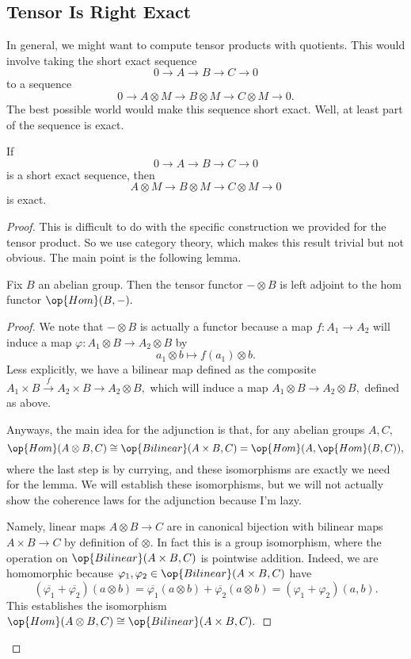 \documentclass[../notes.tex]{subfiles}
\begin{document}
\subsection{Tensor Is Right Exact}
In general, we might want to compute tensor products with quotients. This would involve taking the short exact sequence
\[0\to A\to B\to C\to 0\]
to a sequence
\[0\to A\otimes M\to B\otimes M\to C\otimes M\to0.\]
The best possible world would make this sequence short exact. Well, at least part of the sequence is exact.
\begin{theorem} \label{prop:tensorrightexact}
	If
	\[0\to A\to B\to C\to0\]
	is a short exact sequence, then
	\[A\otimes M\to B\otimes M\to C\otimes M\to0\]
	is exact.
\end{theorem}
\begin{proof}
	This is difficult to do with the specific construction we provided for the tensor product. So we use category theory, which makes this result trivial but not obvious. The main point is the following lemma.
	\begin{lemma} \label{lem:tensorisleft}
		Fix $B$ an abelian group. Then the tensor functor $-\otimes B$ is left adjoint to the hom functor $\op{Hom}(B,-).$
	\end{lemma}
	\begin{proof}
		We note that $-\otimes B$ is actually a functor because a map $f:A_1\to A_2$ will induce a map $\varphi:A_1\otimes B\to A_2\otimes B$ by
		\[a_1\otimes b\mapsto f(a_1)\otimes b.\]
		Less explicitly, we have a bilinear map defined as the composite $A_1\times B\stackrel f\to A_2\times B\to A_2\otimes B,$ which will induce a map $A_1\otimes B\to A_2\otimes B,$ defined as above.

		Anyways, the main idea for the adjunction is that, for any abelian groups $A,C,$
		\[\op{Hom}(A\otimes B,C)\cong\op{Bilinear}(A\times B,C)=\op{Hom}(A,\op{Hom}(B,C)),\]
		where the last step is by currying, and these isomorphisms are exactly we need for the lemma. We will establish these isomorphisms, but we will not actually show the coherence laws for the adjunction because I'm lazy.
		
		Namely, linear maps $A\otimes B\to C$ are in canonical bijection with bilinear maps $A\times B\to C$ by definition of $\otimes.$ In fact this is a group isomorphism, where the operation on $\op{Bilinear}(A\times B,C)$ is pointwise addition. Indeed, we are homomorphic because $\varphi_1,\varphi_2\in\op{Bilinear}(A\times B,C)$ have
		\[(\overline{\varphi_1}+\overline{\varphi_2})(a\otimes b)=\overline{\varphi_1}(a\otimes b)+\overline{\varphi_2}(a\otimes b)=(\varphi_1+\varphi_2)(a,b).\]
		This establishes the isomorphism $\op{Hom}(A\otimes B,C)\cong\op{Bilinear}(A\times B,C).$


\end{proof}
\end{proof}
\end{document}

